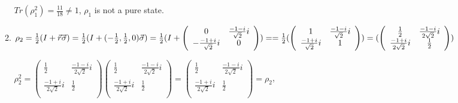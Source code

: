 \documentclass{article}
\begin{document}
\begin{enumerate}
\begin{enumerate}
                    $Tr(\rho_1^2)=\frac{11}{18}\neq1$,
                    $\rho_1$ is not a pure state.
              \item $\rho_2
                        \\=\frac{1}{2}(I+\vec{r}\vec{\sigma})
                        \\=\frac{1}{2}(I+(-\frac{1}{2},\frac{1}{2},0)\vec{\sigma})
                        \\=\frac{1}{2}(I+\left(
                        \begin{array}{cc}
                                0 & \frac{-1-i}{\sqrt{2}}i \\-\frac{-1+i}{\sqrt{2}}i&0\\
                            \end{array}
                        \right))
                        \\==\frac{1}{2}(\left(
                        \begin{array}{cc}
                                1 & \frac{-1-i}{\sqrt{2}}i \\\frac{-1+i}{\sqrt{2}}i&1\\
                            \end{array}
                        \right))
                        \\=(\left(
                        \begin{array}{cc}
                                \frac{1}{2} & \frac{-1-i}{2\sqrt{2}}i \\\frac{-1+i}{2\sqrt{2}}i&\frac{1}{2}\\
                            \end{array}
                        \right))
                    $



                    $\rho_2^2=\left(
                        \begin{array}{cc}
                                \frac{1}{2} & \frac{-1-i}{2\sqrt{2}}i \\\frac{-1+i}{2\sqrt{2}}i&\frac{1}{2}\\
                            \end{array}
                        \right)\left(
                        \begin{array}{cc}
                                \frac{1}{2} & \frac{-1-i}{2\sqrt{2}}i \\\frac{-1+i}{2\sqrt{2}}i&\frac{1}{2}\\
                            \end{array}
                        \right)=\left(
                        \begin{array}{cc}
                                \frac{1}{2} & \frac{-1-i}{2\sqrt{2}}i \\\frac{-1+i}{2\sqrt{2}}i&\frac{1}{2}\\
                            \end{array}
                        \right)
                        =\rho_2
                    $,


\end{enumerate}
\end{enumerate}
\end{document}
